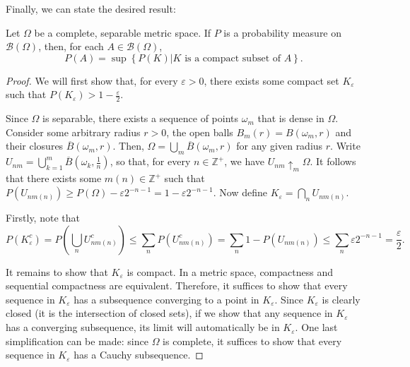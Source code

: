 Finally, we can state the desired result:
\begin{thrm}\label{theorem:approximation by compact sets}
		Let \(\Omega\) be a complete, separable metric space. If \(P\) is a probability measure on \(\mathscr{B}\left(\Omega\right)\), then, for each \(A\in\mathscr{B}\left(\Omega\right)\),
\[
P(A)=\sup\left\{P(K)\left|K\text{ is a compact subset of }A\right.\right\}
.\]
\end{thrm}
\begin{proof}
		We will first show that, for every \(\varepsilon>0\), there exists some compact set \(K_{\varepsilon}\) such that \(P(K_\varepsilon)>1-\frac{\varepsilon}{2}\).

		Since \(\Omega\) is separable, there exists a sequence of points
		\(\omega_m\) that is dense in \(\Omega\). Consider some arbitrary
		radius \(r>0\), the open balls \(B_m(r)=B(\omega_m,r)\)
		and their closures \(\overline{B}(\omega_m,r)\). Then,
		\(\Omega=\bigcup_{m}\overline{B}(\omega_m,r)\) for any given radius
		\(r\). Write
		\(U_{nm}=\bigcup_{k=1}^m\overline{B}\left(\omega_k,\frac{1}{n}\right)\), so
		that, for every \(n\in\mathbb{Z}^{+}\), we have \(U_{nm}\uparrow_m
		\Omega\). It follows that there exists some \(m(n)\in\mathbb{Z}^{+}\)
		such that \(P\left(U_{nm(n)}\right)\geq
		P\left(\Omega\right)-\varepsilon 2^{-n-1}=1-\varepsilon 2^{-n-1}\). Now
		define \(K_{\varepsilon}=\bigcap_{n}U_{nm(n)}\).

		Firstly, note that
		\[
				P(K_{\varepsilon}^c)=P\left(\bigcup_{n}U_{nm(n)}^c\right)\leq\sum_{n} P\left(U_{nm(n)}^c\right)=\sum_{n} 1-P\left(U_{nm(n)}\right)\leq\sum_{n} \varepsilon 2^{-n-1}=\frac{\varepsilon}{2}
		.\]

		It remains to show that \(K_{\varepsilon}\) is compact. In a metric space, compactness and sequential compactness are equivalent. Therefore, it suffices to show that every sequence in \(K_{\varepsilon}\) has a subsequence converging to a point in \(K_{\varepsilon}\). Since \(K_{\varepsilon}\) is clearly closed (it is the intersection of closed sets), if we show that any sequence in \(K_{\varepsilon}\) has a converging subsequence, its limit will automatically be in \(K_{\varepsilon}\). One last simplification can be made: since \(\Omega\) is complete, it suffices to show that every sequence in \(K_{\varepsilon}\) has a Cauchy subsequence.


\end{proof}
